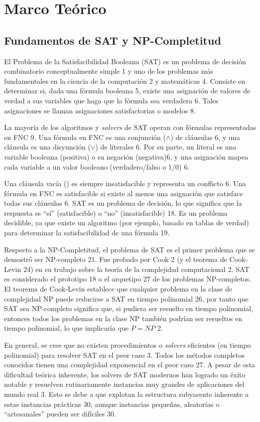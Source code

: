 \chapter{Marco Teórico}\label{chapter:state-of-the-art}
\section{Fundamentos de SAT y NP-Completitud}
El Problema de la Satisfacibilidad Booleana (SAT) es un problema de decisión combinatorio conceptualmente simple 1 y uno de los problemas más fundamentales en la ciencia de la computación 2 y matemáticas 4. Consiste en determinar si, dada una fórmula booleana 5, existe una asignación de valores de verdad a sus variables que haga que la fórmula sea verdadera 6. Tales asignaciones se llaman asignaciones satisfactorias o modelos 8.

La mayoría de los algoritmos y \textit{solvers} de SAT operan con fórmulas representadas en FNC 9. Una fórmula en FNC es una conjunción ($\land$) de cláusulas 6, y una cláusula es una disyunción ($\lor$) de literales 6. Por su parte, un literal es una variable booleana (positiva) o su negación (negativa)6, y una asignación mapea cada variable a un valor booleano (verdadero/falso o 1/0) 6.

Una cláusula vacía ({}) es siempre insatisfacible y representa un conflicto 6. Una fórmula en FNC es satisfacible si existe al menos una asignación que satisface todas sus cláusulas 6. SAT es un problema de decisión, lo que significa que la respuesta es ``sí'' (satisfacible) o ``no'' (insatisfacible) 18. Es un problema decidible, ya que existe un algoritmo (por ejemplo, basado en tablas de verdad) para determinar la satisfacibilidad de una fórmula 19.

Respecto a la NP-Completitud, el problema de SAT es el primer problema que se demostró ser NP-completo 21. Fue probado por Cook 2 (y el teorema de Cook-Levin 24) en su trabajo sobre la teoría de la complejidad computacional 2. SAT es considerado el prototipo 18 o el arquetipo 27 de los problemas NP-completos. El teorema de Cook-Levin establece que cualquier problema en la clase de complejidad NP puede reducirse a SAT en tiempo polinomial 26, por tanto que SAT sea NP-completo significa que, si pudiera ser resuelto en tiempo polinomial, entonces todos los problemas en la clase NP también podrían ser resueltos en tiempo polinomial, lo que implicaría que $P=NP $ 2.

En general, se cree que no existen procedimientos o \textit{solvers} eficientes (en tiempo polinomial) para resolver SAT en el peor caso 3. Todos los métodos completos conocidos tienen una complejidad exponencial en el peor caso 27. A pesar de esta dificultad teórica inherente, los solvers de SAT modernos han logrado un éxito notable y resuelven rutinariamente instancias muy grandes de aplicaciones del mundo real 3. Esto se debe a que explotan la estructura subyacente inherente a estas instancias prácticas 30, aunque instancias pequeñas, aleatorias o ``artesanales'' pueden ser difíciles 30.

